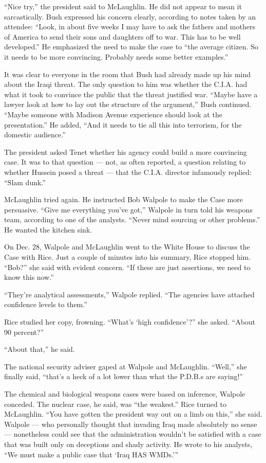 ``Nice try,'' the president said to McLaughlin. He did not appear to
mean it sarcastically. Bush expressed his concern clearly, according to
notes taken by an attendee: ``Look, in about five weeks I may have to
ask the fathers and mothers of America to send their sons and daughters
off to war. This has to be well developed.'' He emphasized the need to
make the case to ``the average citizen. So it needs to be more
convincing. Probably needs some better examples.''

It was clear to everyone in the room that Bush had already made up his
mind about the Iraqi threat. The only question to him was whether the
C.I.A. had what it took to convince the public that the threat justified
war. ``Maybe have a lawyer look at how to lay out the structure of the
argument,'' Bush continued. ``Maybe someone with Madison Avenue
experience should look at the presentation.'' He added, ``And it needs
to tie all this into terrorism, for the domestic audience.''

The president asked Tenet whether his agency could build a more
convincing case. It was to that question --- not, as often reported, a
question relating to whether Hussein posed a threat --- that the C.I.A.
director infamously replied: ``Slam dunk.''

McLaughlin tried again. He instructed Bob Walpole to make the Case more
persuasive. ``Give me everything you've got,'' Walpole in turn told his
weapons team, according to one of the analysts. ``Never mind sourcing or
other problems.'' He wanted the kitchen sink.

On Dec. 28, Walpole and McLaughlin went to the White House to discuss
the Case with Rice. Just a couple of minutes into his summary, Rice
stopped him. ``Bob?'' she said with evident concern. ``If these are just
assertions, we need to know this now.''

``They're analytical assessments,'' Walpole replied. ``The agencies have
attached confidence levels to them.''

Rice studied her copy, frowning. ``What's `high confidence'?'' she
asked. ``About 90 percent?''

``About that,'' he said.

The national security adviser gaped at Walpole and McLaughlin. ``Well,''
she finally said, ``that's a heck of a lot lower than what the P.D.B.s
are saying!''

The chemical and biological weapons cases were based on inference,
Walpole conceded. The nuclear case, he said, was ``the weakest.'' Rice
turned to McLaughlin. ``You have gotten the president way out on a limb
on this,'' she said. Walpole --- who personally thought that invading
Iraq made absolutely no sense --- nonetheless could see that the
administration wouldn't be satisfied with a case that was built only on
deceptions and shady activity. He wrote to his analysts, ``We must make
a public case that `Iraq HAS WMDs.'''

